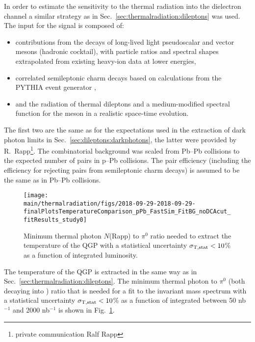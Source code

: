 \documentclass[../report.tex]{subfiles}
\providecommand{\main}{..}
\begin{document}
In order to estimate the sensitivity to the thermal radiation into the dielectron channel a similar strategy as in Sec.~\ref{sec:thermalradiation:dileptons} was used. 
The input for the signal is composed of:
\begin{itemize}
\item contributions from the decays of long-lived light pseudoscalar and vector mesons (hadronic cocktail), with particle ratios and spectral shapes extrapolated from existing heavy-ion data at lower energies,
\item correlated semileptonic charm decays based on calculations from the PYTHIA event generator \cite{Sjostrand:2006za}, 
\item and the radiation of thermal dileptons and a medium-modified spectral function for the \Prho meson in a realistic space-time evolution.
\end{itemize}
The first two are the same as for the expectations used in the extraction of dark photon limits in Sec.~\ref{sec:dileptons:darkphotons}, the latter were provided by R.~Rapp\footnote{private communication Ralf Rapp}. The combinatorial background was scaled from Pb--Pb collisions to the expected number of pairs in p--Pb collisions. The pair efficiency (including the efficiency for rejecting \Pepem pairs from semileptonic charm decays) is assumed to be the same as in Pb--Pb collisions. 

\begin{figure}[htb]
\centering
\texttt{[image: \\main/thermalradiation/figs/2018-09-29-2018-09-29-finalPlotsTemperatureComparison\_pPb\_FastSim\_FitBG\_noDCAcut\_fitResults\_study0]}
\caption{Minimum thermal photon $N$(Rapp) to $\pi^{0}$ ratio needed to extract the temperature of the QGP with a statistical uncertainty $\sigma_{\rm T,stat} < 10$\% as a function of integrated luminosity.}
\label{fig:SignalScalingVsLumi_Rapp_pPb}
\end{figure}

The temperature of the QGP is extracted in the same way as in Sec.~\ref{sec:thermalradiation:dileptons}. The minimum thermal photon to $\pi^{0}$ (both decaying into \Pepem) ratio that is needed for a fit to the invariant mass spectrum with a statistical uncertainty $\sigma_{\rm T,stat} < 10$\% as a function of integrated between 50 nb$^{-1}$ and 2000 nb$^{-1}$ is shown in Fig.~\ref{fig:SignalScalingVsLumi_Rapp_pPb}. 
\end{document}
